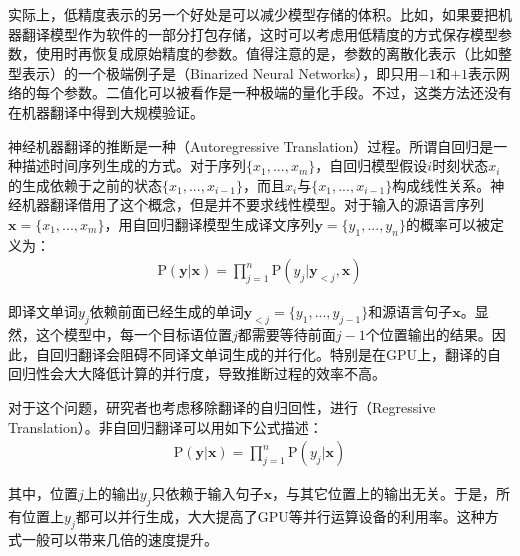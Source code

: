 \parinterval 实际上，低精度表示的另一个好处是可以减少模型存储的体积。比如，如果要把机器翻译模型作为软件的一部分打包存储，这时可以考虑用低精度的方式保存模型参数，使用时再恢复成原始精度的参数。值得注意的是，参数的离散化表示（比如整型表示）的一个极端例子是{\small{}}（Binarized Neural Networks）\cite{DBLP:conf/nips/HubaraCSEB16}，即只用$-1$和$+1$表示网络的每个参数。二值化可以被看作是一种极端的量化手段。不过，这类方法还没有在机器翻译中得到大规模验证。

\vspace{0.5em}
\vspace{0.5em}

\parinterval 神经机器翻译的推断是一种{\small{}}（Autoregressive Translation）过程。所谓自回归是一种描述时间序列生成的方式。对于序列$\{ x_1,...,x_m \}$，自回归模型假设$i$时刻状态$x_i$的生成依赖于之前的状态$\{ x_1,...,x_{i-1} \}$，而且$x_i$与$\{ x_1,...,x_{i-1} \}$构成线性关系。神经机器翻译借用了这个概念，但是并不要求线性模型。对于输入的源语言序列$\mathbf{x}=\{ x_1,...,x_m \}$，用自回归翻译模型生成译文序列$\mathbf{y}=\{ y_1,...,y_n \}$的概率可以被定义为：
\begin{eqnarray}
\textrm{P}(\mathbf{y}|\mathbf{x}) = \prod_{j=1}^{n} \textrm{P}(y_j|\mathbf{y}_{<j},\mathbf{x})
\label{eq:7-6}
\end{eqnarray}

\noindent 即译文单词$y_j$依赖前面已经生成的单词$\mathbf{y}_{<j}=\{y_1,...,y_{j-1}\}$和源语言句子$\mathbf{x}$。显然，这个模型中，每一个目标语位置$j$都需要等待前面$j-1$个位置输出的结果。因此，自回归翻译会阻碍不同译文单词生成的并行化。特别是在GPU上，翻译的自回归性会大大降低计算的并行度，导致推断过程的效率不高。

\parinterval 对于这个问题，研究者也考虑移除翻译的自归回性\cite{Gu2017NonAutoregressiveNM}，进行{\small{}}（Regressive Translation）。非自回归翻译可以用如下公式描述：
\begin{eqnarray}
\textrm{P}(\mathbf{y}|\mathbf{x}) = \prod_{j=1}^{n} \textrm{P}(y_j| \mathbf{x})
\label{eq:7-7}
\end{eqnarray}

\noindent 其中，位置$j$上的输出$y_j$只依赖于输入句子$\mathbf{x}$，与其它位置上的输出无关。于是，所有位置上$y_j$都可以并行生成，大大提高了GPU等并行运算设备的利用率。这种方式一般可以带来几倍的速度提升。

